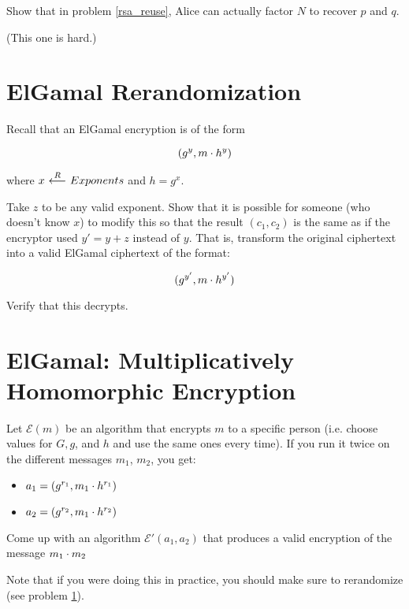 \documentclass[12pt]{article}
\begin{document}
Show that in problem \ref{rsa_reuse}, Alice can actually factor $N$ to recover $p$ and $q$.

(This one is hard.)


\section{ElGamal Rerandomization}

\label{rerandomize}

Recall that an ElGamal encryption is of the form

$$
(g^y, m \cdot h^y)
$$

where $x {\ \overset{R}\longleftarrow\ } Exponents$ and $h = g^x$.

Take $z$ to be any valid exponent. Show that it is possible for someone (who doesn't know $x$) to modify this so that the result $(c_1, c_2)$ is the same as if the encryptor used $y' = y + z$ instead of $y$. That is, transform the original ciphertext into a valid ElGamal ciphertext of the format:

$$
(g^{y'}, m \cdot h^{y'})
$$

Verify that this decrypts.

\section{ElGamal: Multiplicatively Homomorphic Encryption}

Let $\mathcal{E}(m)$ be an algorithm that encrypts $m$ to a specific person (i.e. choose values for $G, g$, and $h$ and use the same ones every time). If you run it twice on the different messages $m_1$, $m_2$, you get:

\begin{itemize}
\item $a_1 = (g^{r_1}, m_1 \cdot h^{r_1})$
\item $a_2 = (g^{r_2}, m_1 \cdot h^{r_2})$
\end{itemize}

Come up with an algorithm $\mathcal{E'}(a_1, a_2)$ that produces a valid encryption of the message $m_1 \cdot m_2$


Note that if you were doing this in practice, you should make sure to rerandomize (see problem \ref{rerandomize}).


\end{document}
